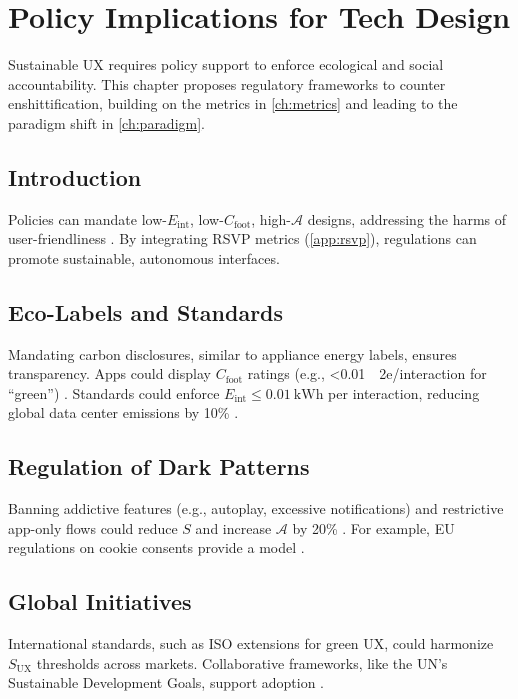 \documentclass[openany]{book}
\newcommand{\Sent}{S} %
\newcommand{\Eint}{E_{\mathrm{int}}} %
\newcommand{\Cfoot}{C_{\mathrm{foot}}} %
\newcommand{\Auton}{\mathcal{A}} %
\newcommand{\SUX}{S_{\mathrm{UX}}} %
\newcommand{\kWh}{\mathrm{kWh}}
\begin{document}
\chapter{Policy Implications for Tech Design}
\label{ch:policy}

Sustainable UX requires policy support to enforce ecological and social accountability. This chapter proposes regulatory frameworks to counter enshittification, building on the metrics in \cref{ch:metrics} and leading to the paradigm shift in \cref{ch:paradigm}.

\section{Introduction}
\label{sec:policy-intro}
Policies can mandate low-$\Eint$, low-$\Cfoot$, high-$\Auton$ designs, addressing the harms of user-friendliness \citep{adobe2021,doctorow2022}. By integrating RSVP metrics (\cref{app:rsvp}), regulations can promote sustainable, autonomous interfaces.

\section{Eco-Labels and Standards}
\label{sec:policy-labels}
Mandating carbon disclosures, similar to appliance energy labels, ensures transparency. Apps could display $\Cfoot$ ratings (e.g., \SI{<0.01}{\kgCO2e}/interaction for \textquotedblleft green\textquotedblright) \citep{adobe2021}. Standards could enforce $\Eint \leq \SI{0.01}{\kWh}$ per interaction, reducing global data center emissions by 10\% \citep{extentia2024}.

\section{Regulation of Dark Patterns}
\label{sec:policy-dark}
Banning addictive features (e.g., autoplay, excessive notifications) and restrictive app-only flows could reduce $\Sent$ and increase $\Auton$ by 20\% \citep{colak2024,doctorow2022}. For example, EU regulations on cookie consents provide a model \citep{colak2024}.

\section{Global Initiatives}
\label{sec:policy-global}
International standards, such as ISO extensions for green UX, could harmonize $\SUX$ thresholds across markets. Collaborative frameworks, like the UN’s Sustainable Development Goals, support adoption \citep{adobe2021}.
\end{document}
